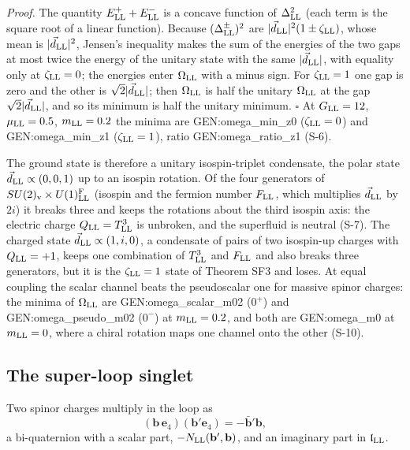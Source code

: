 \noindent\emph{Proof.} The quantity $E^+_{\rm LL}+E^-_{\rm LL}$ is a concave function of $\Delta_{\rm
LL}^2$ (each term is the square root of a linear function). Because $(\Delta^\pm_{\rm LL})^2$ are
$\lvert\vec d_{\rm LL}\rvert^2(1\pm\zeta_{\rm LL})$, whose mean is $\lvert\vec d_{\rm LL}\rvert^2$, Jensen's
inequality makes the sum of the energies of the two gaps at most twice the energy of the unitary state
with the same $\lvert\vec d_{\rm LL}\rvert$, with equality only at $\zeta_{\rm LL}=0$; the energies enter
$\Omega_{\rm LL}$ with a minus sign. For $\zeta_{\rm LL}=1$ one gap is zero and the other is
$\sqrt2\lvert\vec d_{\rm LL}\rvert$; then $\Omega_{\rm LL}$ is half the unitary $\Omega_{\rm LL}$ at the gap
$\sqrt2\lvert\vec d_{\rm LL}\rvert$, and so its minimum is half the unitary minimum. $\square$ At
$G_{\rm LL}=12$, $\mu_{\rm LL}=0.5$, $m_{\rm LL}=0.2$ the minima are {{GEN:omega_min_z0}} ($\zeta_{\rm LL}=0$)
and {{GEN:omega_min_z1}} ($\zeta_{\rm LL}=1$), ratio {{GEN:omega_ratio_z1}} (S-6).

The ground state is therefore a unitary isospin-triplet condensate, the polar state $\vec d_{\rm
LL}\propto(0,0,1)$ up to an isospin rotation. Of the four generators of $SU(2)_{\rm v}\times
U(1)^{\rm F}_{\rm LL}$ (isospin and the fermion number $F_{\rm LL}$, which multiplies $\vec d_{\rm LL}$ by
$2i$) it breaks three and keeps the rotations about the third isospin axis: the electric charge $Q_{\rm
LL}=T^3_{\rm LL}$ is unbroken, and the superfluid is neutral (S-7). The charged state $\vec d_{\rm
LL}\propto(1,i,0)$, a condensate of pairs of two isospin-up charges with $Q_{\rm LL}=+1$, keeps one
combination of $T^3_{\rm LL}$ and $F_{\rm LL}$ and also breaks three generators, but it is the
$\zeta_{\rm LL}=1$ state of Theorem SF3 and loses. At equal coupling the scalar channel beats the
pseudoscalar one for massive spinor charges: the minima of $\Omega_{\rm LL}$ are {{GEN:omega_scalar_m02}}
($0^+$) and {{GEN:omega_pseudo_m02}} ($0^-$) at $m_{\rm LL}=0.2$, and both are {{GEN:omega_m0}} at $m_{\rm
LL}=0$, where a chiral rotation maps one channel onto the other (S-10).

\subsection{The super-loop singlet}

Two spinor charges multiply in the loop as
\begin{equation}
(\mathbf b\,\mathbf e_4)(\mathbf b'\mathbf e_4)=-\bar{\mathbf b}'\mathbf b,
\label{eq:octpair}
\end{equation}
a bi-quaternion with a scalar part, $-N_{\rm LL}(\mathbf b',\mathbf b)$, and an imaginary part in
$\mathfrak l_{\rm LL}$.

